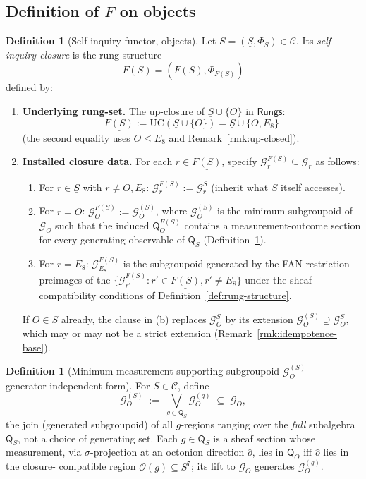 \documentclass[11pt, a4paper]{amsart}
\theoremstyle{definition}
\newtheorem{definition}[theorem]{Definition}
\newcommand{\Rungs}{\mathsf{Rungs}}
\newcommand{\catC}{\mathcal{C}}
\newcommand{\Gcal}{\mathcal{G}}
\newcommand{\Qalg}{\mathsf{Q}}
\begin{document}
\subsection{Definition of $F$ on objects}
\label{subsec:F-objects}

\begin{definition}[Self-inquiry functor, objects]
\label{def:F-objects}
Let $S = (\underline{S}, \Phi_S) \in \catC$. Its \emph{self-inquiry
closure} is the rung-structure
\[
    F(S) = (\underline{F(S)}, \Phi_{F(S)})
\]
defined by:
\begin{enumerate}
\item \textbf{Underlying rung-set.} The up-closure of
  $\underline{S} \cup \{O\}$ in $\Rungs$:
  \[
      \underline{F(S)} := \mathrm{UC}(\underline{S} \cup \{O\})
      = \underline{S} \cup \{O, E_8\}
  \]
  (the second equality uses $O \leq E_8$ and
  Remark~\ref{rmk:up-closed}).

\item \textbf{Installed closure data.} For each $r \in
  \underline{F(S)}$, specify $\Gcal_r^{F(S)} \subseteq \Gcal_r$
  as follows:
  \begin{enumerate}
  \item For $r \in \underline{S}$ with $r \ne O, E_8$:
    $\Gcal_r^{F(S)} := \Gcal_r^S$ (inherit what $S$ itself
    accesses).
  \item For $r = O$:
    $\Gcal_O^{F(S)} := \Gcal_O^{(S)}$, where $\Gcal_O^{(S)}$ is
    the minimum subgroupoid of $\Gcal_O$ such that the induced
    $\Qalg_O^{F(S)}$ contains a measurement-outcome section for
    every generating observable of $\Qalg_S$
    (Definition~\ref{def:min-O}).
  \item For $r = E_8$: $\Gcal_{E_8}^{F(S)}$ is the subgroupoid
    generated by the FAN-restriction preimages of the
    $\{\Gcal_{r'}^{F(S)} : r' \in \underline{F(S)}, r' \ne E_8\}$
    under the sheaf-compatibility conditions of
    Definition~\ref{def:rung-structure}.
  \end{enumerate}
  If $O \in \underline{S}$ already, the clause in (b) replaces
  $\Gcal_O^S$ by its extension $\Gcal_O^{(S)} \supseteq
  \Gcal_O^S$, which may or may not be a strict extension
  (Remark~\ref{rmk:idempotence-base}).
\end{enumerate}
\end{definition}

\begin{definition}[Minimum measurement-supporting subgroupoid
  $\Gcal_O^{(S)}$ — generator-independent form]
\label{def:min-O}
For $S \in \catC$, define
\[
    \Gcal_O^{(S)} \;:=\; \bigvee_{g \in \Qalg_S}
      \Gcal_O^{(g)} \;\subseteq\; \Gcal_O,
\]
the join (generated subgroupoid) of all $g$-regions ranging
over the \emph{full} subalgebra $\Qalg_S$, not a choice of
generating set. Each $g \in \Qalg_S$ is a sheaf section whose
measurement, via $\sigma$-projection at an octonion direction
$\hat o$, lies in $\Qalg_O$ iff $\hat o$ lies in the closure-
compatible region $\mathcal{O}(g) \subseteq S^7$; its lift to
$\Gcal_O$ generates $\Gcal_O^{(g)}$.
\end{definition}
\end{document}
